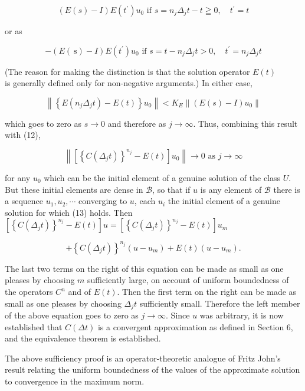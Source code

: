 \documentclass[10pt]{article}
\begin{document}
\[
(E(s)-I) E\left(t^{\prime}\right) u_{0} \text { if } s=n_{j} \Delta_{j} t-t \geqq 0, \quad t^{\prime}=t
\]

or as

\[
-(E(\mathrm{~s})-I) E\left(t^{\prime}\right) u_{0} \text { if } s=t-n_{j} \Delta_{j} t>0, \quad t^{\prime}=n_{j} \Delta_{j} t
\]

(The reason for making the distinction is that the solution operator \(E(t)\)\\
is generally defined only for non-negative arguments.) In either case,

\[
\left\|\left\{E\left(n_{j} \Delta_{j} t\right)-E(t)\right\} u_{0}\right\|<K_{E}\left\|(E(s)-I) u_{0}\right\|
\]

which goes to zero as \(s \rightarrow 0\) and therefore as \(j \rightarrow \infty\). Thus, combining this result with (12),

\[
\left\|\left[\left\{C\left(\Delta_{j} t\right)\right\}^{n_{j}}-E(t)\right] u_{0}\right\| \rightarrow 0 \text { as } j \rightarrow \infty
\]

for any \(u_{0}\) which can be the initial element of a genuine solution of the class \(U\). But these initial elements are dense in \(\mathscr{B}\), so that if \(u\) is any element of \(\mathscr{B}\) there is a sequence \(u_{1}, u_{2}, \cdots\) converging to \(u\), each \(u_{i}\) the initial element of a genuine solution for which (13) holds. Then\\
\(\left[\left\{C\left(\Delta_{j} t\right)\right\}^{n_{j}}-E(t)\right] u=\left[\left\{C\left(\Delta_{j} t\right)\right\}^{n_{j}}-E(t)\right] u_{m}\)

\[
+\left\{C\left(\Delta_{j} t\right)\right\}^{n_{j}}\left(u-u_{m}\right)+E(t)\left(u-u_{m}\right) .
\]

The last two terms on the right of this equation can be made as small as one pleases by choosing \(m\) sufficiently large, on account of uniform boundedness of the operators \(C^{n}\) and of \(E(t)\). Then the first term on the right can be made as small as one pleases by choosing \(\Delta_{j} t\) sufficiently small. Therefore the left member of the above equation goes to zero as \(j \rightarrow \infty\). Since \(u\) was arbitrary, it is now established that \(C(\Delta t)\) is a convergent approximation as defined in Section 6, and the equivalence theorem is established.

The above sufficiency proof is an operator-theoretic analogue of Fritz John's result relating the uniform boundedness of the values of the approximate solution to convergence in the maximum norm.
\end{document}
